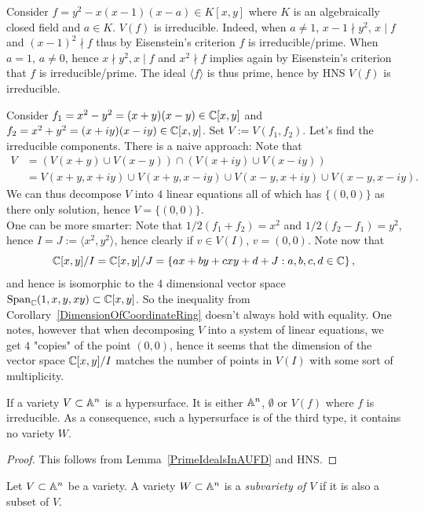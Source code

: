 \begin{example}
    Consider $f = y^2-x(x-1)(x-a)\in K[x,y]$ where $K$ is an algebraically closed field and $a\in K$. $V(f)$ is irreducible. Indeed, when $a \neq 1$, $x-1\nmid y^2$, $x\mid f$ and $(x-1)^2\nmid f$ thus by Eisenstein's criterion $f$ is irreducible/prime. When $a=1$, $a\neq0$, hence $x\nmid y^2,x\mid f$ and $x^2\nmid f $ implies again by Eisenstein's criterion that $f$ is irreducible/prime. The ideal $\langle f\rangle$ is thus prime, hence by HNS $V(f)$ is irreducible.   
\end{example}
\begin{example}
    Consider $f_1=x^2-y^2 =(x+y)(x-y)\in \mathbb{C}[x,y]$ and $f_2=x^2+y^2=(x+iy)(x-iy)\in\mathbb{C}[x,y]$. Set $V:=V(f_1,f_2)$. Let's find the irreducible components. There is a naive approach: Note that 
    \begin{align*}
        V&=(V(x+y)\cup V(x-y))\cap(V(x+iy)\cup V(x-iy))\\ &=V(x+y,x+iy)\cup V(x+y,x-iy)\cup V(x-y,x+iy)\cup V(x-y,x-iy).
    \end{align*}
    We can thus decompose $V$ into $4$ linear equations all of which has $\{(0,0)\}$ as there only solution, hence $V=\{(0,0)\}$.\\ One can be more smarter: Note that $1/2(f_1+f_2) = x^2$ and $1/2(f_2-f_1)=y^2$, hence $I = J := \langle x^2,y^2\rangle$, hence clearly if $v\in V(I)$, $v=(0,0)$. Note now that 
    $$\mathbb{C}[x,y]/I=\mathbb{C}[x,y]/J = \left\{ ax+by+cxy+d + J : a,b,c,d\in\mathbb{C} \right\},$$
    and hence is isomorphic to the 4 dimensional vector space $\mathrm{Span}_{\mathbb{C}}(1,x,y,xy)\subset \mathbb{C}[x,y]$. So the inequality from Corollary~\ref{DimensionOfCoordinateRing} doesn't always hold with equality. One notes, however that when decomposing $V$ into a system of linear equations, we get $4$ "copies" of the point $(0,0)$, hence it seems that the dimension of the vector space $\mathbb{C}[x,y]/I$ matches the number of points in $V(I)$ with some sort of multiplicity.    
\end{example}
\begin{corollary}
    If a variety $V\subset \mathbb{A}^n$ is a hypersurface. It is either $\mathbb{A}^n$, $\emptyset$ or $V(f)$ where $f$ is irreducible. As a consequence, such a hypersurface is of the third type, it contains no variety $W$.  
\end{corollary} 
\begin{proof}
    This follows from Lemma~\ref{PrimeIdealsInAUFD} and HNS.
\end{proof}
\begin{definition}
    Let $V\subset \mathbb{A}^n$ be a variety. A variety $W\subset \mathbb{A}^n$ is a \textit{subvariety of $V$} if it is also a subset of $V$. 
\end{definition}
